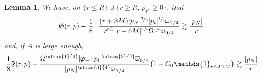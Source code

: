 \documentclass[10pt]{amsart}
\theoremstyle{plain}
\newtheorem{lemma}[proposition]{Lemma}
\theoremstyle{definition}
\begin{document}
\begin{lemma}\label{LemtechniCompu}
We have, on $\{ r \leq R\} \cup \{ r \geq R, \, p_{r^*} \geq 0 \}$, that\vspace*{-3pt}
\begin{equation*}
\mathfrak{G}(r,p)- \frac{1}{8} \cdot \frac{(r+3M)|p_N|^{\sfrac{3}{4}} |p_t|^{\sfrac{1}{4}}\overline{\omega}_{1/4} }{r^{\sfrac{5}{2}}|r+6M|^{\sfrac{3}{2}}\Omega^{\sfrac{1}{2}} \overline{\omega}_{9/4}} \gtrsim \frac{|p_N|}{r}.
\end{equation*}
and, if $A$ is large enough,\vspace*{-3pt}
\begin{equation*}
\frac{1}{8}\mathfrak{F}(r,p)- \frac{ \Omega^{\sfrac{1}{2}}|\pmb{\varphi}_-||p_t|^{\sfrac{3}{4}}\overline{\omega}_{9/4}}{ |p_N|^{\sfrac{3}{4}}\overline{\omega}_{1/4}}\bigl(1+ C_0 \mathds{1}_{r \leq 2.7M} \bigr) \gtrsim \frac{|p_N|}{r}
\end{equation*}
\end{lemma}
\end{document}

